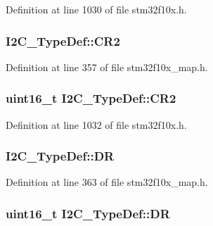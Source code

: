 Definition at line 1030 of file stm32f10x.\+h.

\subsubsection[{\texorpdfstring{C\+R2}{CR2}}]{ I2\+C\+\_\+\+Type\+Def\+::\+C\+R2}\hypertarget{struct_i2_c___type_def_a4db1534c696d7f12497370063195a086}{}\label{struct_i2_c___type_def_a4db1534c696d7f12497370063195a086}


Definition at line 357 of file stm32f10x\+\_\+map.\+h.

\subsubsection[{\texorpdfstring{C\+R2}{CR2}}]{ {\bf uint16\+\_\+t} I2\+C\+\_\+\+Type\+Def\+::\+C\+R2}\hypertarget{struct_i2_c___type_def_ac8bff45acc455489620d50e697a24c9d}{}\label{struct_i2_c___type_def_ac8bff45acc455489620d50e697a24c9d}


Definition at line 1032 of file stm32f10x.\+h.

\subsubsection[{\texorpdfstring{DR}{DR}}]{ I2\+C\+\_\+\+Type\+Def\+::\+DR}\hypertarget{struct_i2_c___type_def_a72b8f9df9717ada07d2a6d34f30d0638}{}\label{struct_i2_c___type_def_a72b8f9df9717ada07d2a6d34f30d0638}


Definition at line 363 of file stm32f10x\+\_\+map.\+h.

\subsubsection[{\texorpdfstring{DR}{DR}}]{ {\bf uint16\+\_\+t} I2\+C\+\_\+\+Type\+Def\+::\+DR}\hypertarget{struct_i2_c___type_def_a5c1551b886fbb8e801b9203f6d7dc7c5}{}\label{struct_i2_c___type_def_a5c1551b886fbb8e801b9203f6d7dc7c5}



